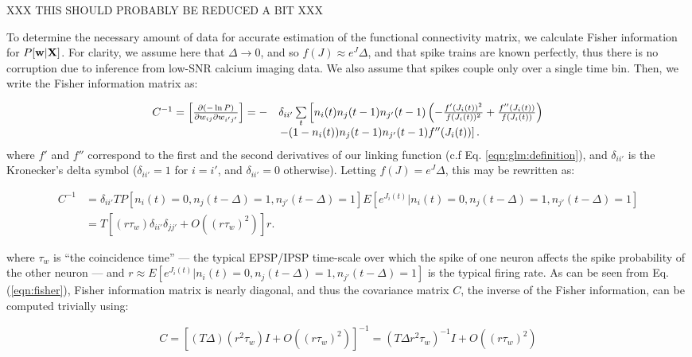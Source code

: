 XXX THIS SHOULD PROBABLY BE REDUCED A BIT XXX

To determine the necessary amount of data for accurate estimation of the functional connectivity matrix, we calculate Fisher information for $P[\mathbf{w}| {\bf X}]$. For clarity, we assume here that $\Delta \rightarrow 0$, and so $f(J)\approx e^J\Delta$, and that spike trains are known perfectly, thus there is no corruption due to inference from low-SNR calcium imaging data. We also assume that spikes couple only over a single time bin. Then, we write the Fisher information matrix as:

\begin{equation}
\begin{array}{rl}
C^{-1}=\left[\frac{\partial (-\ln P)}{\partial \w_{ij}\partial \w_{i'j'}}\right]
=-&\delta_{ii'}\sum\limits_t\left[
n_i(t)n_{j}(t-1)n_{j'}(t-1)\left(-\frac{f'(J_i(t))^2}{f(J_i(t))^2} +
\frac{f''(J_i(t))}{f(J_i(t))}\right) \right. \\
&\left.-(1-n_i(t))n_{j}(t-1)n_{j'}(t-1)f''(J_i(t))\right].
\end{array}
\end{equation}
 where $f'$ and $f''$ correspond to the first and the second derivatives of our linking function (c.f Eq. \ref{eqn:glm:definition}), and $\delta_{ii'}$ is 
 the Kronecker's delta symbol ($\delta_{ii'}=1$ for $i=i'$, and $\delta_{ii'}=0$ otherwise).  Letting $f(J)=e^J\Delta$, this may be rewritten as:

\begin{equation}\label{eqn:fisher}
\begin{array}{rl}
C^{-1}
&=\delta_{ii'} T P[n_i(t)=0, n_j(t-\Delta)=1, n_{j'}(t-\Delta)=1]E[e^{J_i(t)}|n_i(t)=0, n_j(t-\Delta)=1, n_{j'}(t-\Delta)=1] \\
&= T\left[(r \tau_w)\delta_{ii'}\delta_{jj'}+O((r \tau_w)^2)\right]r.
\end{array}
\end{equation}

\noindent where $ \tau_w$ is ``the coincidence time'' --- the typical EPSP/IPSP time-scale over which the spike of one neuron affects the spike probability of the other neuron --- and $r \approx E[e^{J_i(t)}|n_i(t)=0, n_j(t-\Delta)=1, n_{j'}(t-\Delta)=1]$ is the typical firing rate.  
As can be seen from Eq. (\ref{eqn:fisher}), Fisher information matrix is nearly diagonal, and thus the covariance matrix $C$, the inverse of the Fisher information, can be computed trivially using:

\begin{equation}
C = \left[(T\Delta)(r^2 \tau_w) I +O((r \tau_w)^2)\right]^{-1} =
(T\Delta r^2 \tau_w)^{-1} I + O((r \tau_w)^2)
\end{equation}

